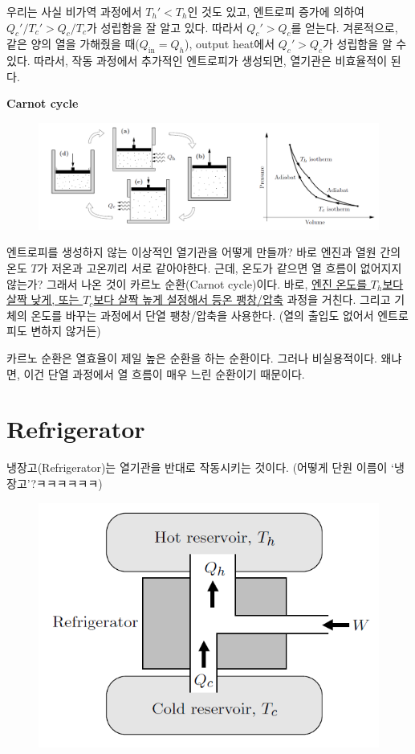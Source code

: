 \documentclass{article}
\begin{document}
우리는 사실 비가역 과정에서 $T_h ' < T_h$인 것도 있고, 엔트로피 증가에 의하여 $Q_c ' / T_c ' > Q_c / T_c$가 성립함을 잘 알고 있다. 따라서 $Q_c ' > Q_c$를 얻는다. 겨론적으로, 같은 양의 열을 가해줬을 때($Q_\text{in} = Q_h$), output heat에서 $Q_c ' > Q_c$가 성립함을 알 수 있다. 따라서, 작동 과정에서 추가적인 엔트로피가 생성되면, 열기관은 비효율적이 된다.


\newpage

\noindent
\textbf{Carnot cycle}

\begin{figure}[h]
    \centering
    \includegraphics[width=0.95\linewidth]{images/fig1_2.png}
\end{figure}

엔트로피를 생성하지 않는 이상적인 열기관을 어떻게 만들까? 바로 엔진과 열원 간의 온도 $T$가 저온과 고온끼리 서로 같아야한다. 근데, 온도가 같으면 열 흐름이 없어지지 않는가? 그래서 나온 것이 카르노 순환(Carnot cycle)이다. 바로, \underline{엔진 온도를 $T_h$보다 살짝 낮게, 또는 $T_c$보다 살짝 높게 설정해서 등온 팽창/압축} 과정을 거친다. 그리고 기체의 온도를 바꾸는 과정에서 단열 팽창/압축을 사용한다. (열의 출입도 없어서 엔트로피도 변하지 않거든)

카르노 순환은 열효율이 제일 높은 순환을 하는 순환이다. 그러나  비실용적이다. 왜냐면, 이건 단열 과정에서 열 흐름이 매우 느린 순환이기 때문이다.

\section{Refrigerator}

냉장고(Refrigerator)는 열기관을 반대로 작동시키는 것이다.  (어떻게 단원 이름이 `냉장고'?ㅋㅋㅋㅋㅋㅋ)

\begin{figure}[h]
    \centering
    \includegraphics[width=0.4\linewidth]{images/fig2_1.png}
\end{figure}
\end{document}
